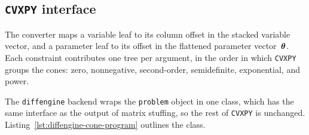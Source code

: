 \subsection{\texttt{CVXPY} interface}\label{sec:theme1-backend}

The converter maps a variable leaf to its column offset in the stacked variable vector,
and a parameter leaf to its offset in the flattened parameter vector~$\bm{\theta}$.
Each constraint contributes one tree per
argument, in the order in which \texttt{CVXPY} groups the cones: zero, nonnegative,
second-order, semidefinite, exponential, and power.

The \texttt{diffengine} backend wraps the \texttt{problem} object in one class, which has
the same interface as the output of matrix stuffing, so the rest of \texttt{CVXPY} is
unchanged. Listing~\ref{lst:diffengine-cone-program} outlines the class.

